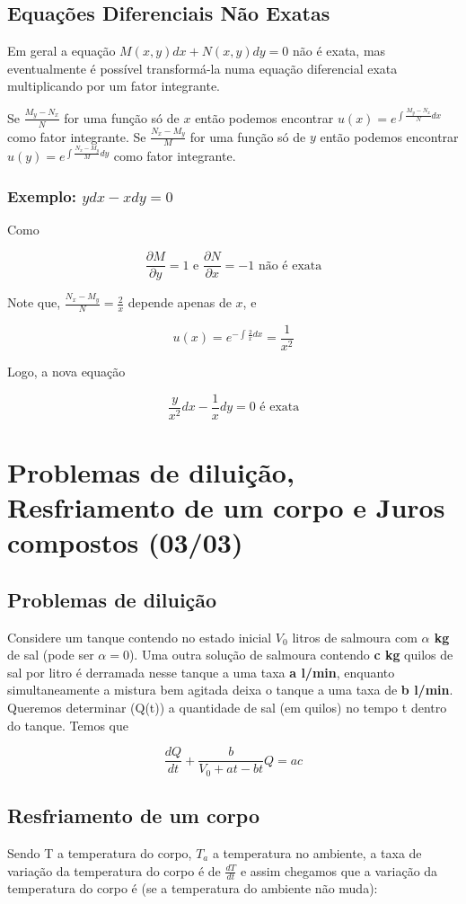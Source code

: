 \documentclass[12pt]{article}
\begin{document}
\subsection*{Equações Diferenciais Não Exatas}
Em geral a equação $M(x, y) d x + N(x, y) d y = 0$ não é exata, mas eventualmente é possível transformá-la numa equação diferencial exata multiplicando por um fator integrante.

Se $\frac{M_y - N_x}{N}$ for uma função só de $x$ então podemos encontrar $u(x) = e^{\int \frac{M_y - N_x}{N} d x}$ como fator integrante. Se $\frac{N_x - M_y}{M}$ for uma função só de $y$ então podemos encontrar $u(y) = e^{\int \frac{N_x - M_y}{M} d y}$ como fator integrante.

\subsubsection*{Exemplo: $y d x - x d y = 0$}
Como

$$\dfrac{\partial M}{\partial y} = 1 \text{ e } \dfrac{\partial N}{\partial x} = -1 \text{ não é exata}$$

Note que, $\frac{N_x - M_y}{N} = \frac{2}{x}$ depende apenas de $x$, e

$$u(x) = e^{-\int \frac{2}{x} d x} = \dfrac{1}{x^2}$$

Logo, a nova equação

$$\dfrac{y}{x^2} d x - \dfrac{1}{x} d y = 0 \text{ é exata}$$

\section{Problemas de diluição, Resfriamento de um corpo e Juros compostos (03/03)}
\subsection*{Problemas de diluição}
Considere um tanque contendo no estado inicial $V_0$ litros de salmoura com \textbf{$\alpha$ kg} de sal (pode ser $\alpha = 0$).
Uma outra solução de salmoura contendo \textbf{c kg} quilos de sal por litro é derramada nesse tanque a uma taxa \textbf{a l/min}, enquanto simultaneamente a mistura bem agitada deixa o tanque a uma taxa de \textbf{b l/min}. Queremos determinar (Q(t)) a quantidade de sal (em quilos) no tempo t dentro do tanque. Temos que

$$\dfrac{d Q}{d t} + \dfrac{b}{V_0 + a t - b t} Q = a c$$

\subsection*{Resfriamento de um corpo}
Sendo T a temperatura do corpo, $T_a$ a temperatura no ambiente, a taxa de variação da temperatura do corpo é de $\frac{d T}{d t}$ e assim chegamos que a variação da temperatura do corpo é (se a temperatura do ambiente não muda):
\end{document}
